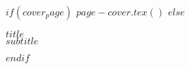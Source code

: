 $if(cover_page)$
  $page-cover.tex()$
$else$

\begin{spacing}{2.0}
\noindent
{\huge {\MakeUppercase{$title$}}}\\
{\Large {$subtitle$}}
\end{spacing}

$endif$ %


